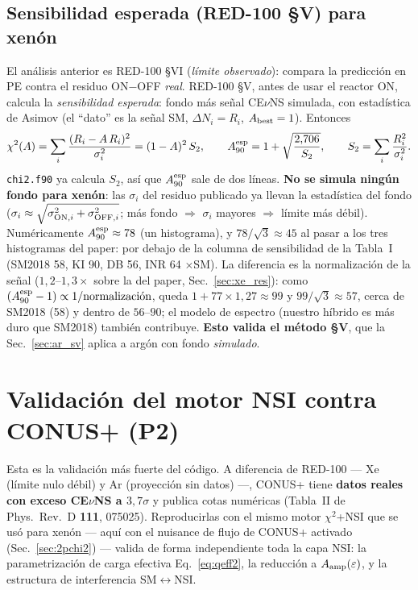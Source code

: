 \documentclass[11pt,a4paper]{article}
\newcommand{\eps}{\varepsilon}
\newcommand{\Aamp}{A_{\rm amp}}
\newcommand{\code}[1]{\texttt{#1}}
\begin{document}
\subsection{Sensibilidad esperada (RED-100 \S V) para xen\'on}
\label{sec:xe_sv}

El an\'alisis anterior es RED-100 \S VI (\emph{l\'imite observado}): compara la
predicci\'on en PE contra el residuo ON$-$OFF \emph{real}. RED-100 \S V, antes de
usar el reactor ON, calcula la \emph{sensibilidad esperada}: fondo m\'as se\~nal
CE$\nu$NS simulada, con estad\'istica de Asimov (el ``dato'' es la se\~nal SM,
$\Delta N_{i} = R_{i}$, $A_{\rm best}=1$). Entonces
\begin{equation}
  \label{eq:A90_esp}
  \chi^{2}(A) = \sum_{i}\frac{(R_{i} - A\,R_{i})^{2}}{\sigma_{i}^{2}}
             = (1-A)^{2}\,S_{2},
  \qquad
  A_{90}^{\rm esp} = 1 + \sqrt{\frac{2{,}706}{S_{2}}},
  \qquad
  S_{2} = \sum_{i}\frac{R_{i}^{2}}{\sigma_{i}^{2}} .
\end{equation}
\code{chi2.f90} ya calcula $S_{2}$, as\'i que $A_{90}^{\rm esp}$ sale de dos
l\'ineas. \textbf{No se simula ning\'un fondo para xen\'on}: las $\sigma_{i}$ del
residuo publicado ya llevan la estad\'istica del fondo
($\sigma_{i}\approx\sqrt{\sigma_{{\rm ON},i}^{2}+\sigma_{{\rm OFF},i}^{2}}$; m\'as
fondo $\Rightarrow$ $\sigma_{i}$ mayores $\Rightarrow$ l\'imite m\'as d\'ebil).
Num\'ericamente $A_{90}^{\rm esp}\approx 78$ (un histograma), y
$78/\sqrt{3}\approx 45$ al pasar a los tres histogramas del paper: por debajo de
la columna de sensibilidad de la Tabla~I (SM2018 58, KI 90, DB 56, INR 64
$\times$SM). La diferencia es la normalizaci\'on de la se\~nal ($1{,}2$--$1{,}3\times$
sobre la del paper, Sec.~\ref{sec:xe_res}): como $(A_{90}^{\rm esp}-1)\propto
1/\text{normalizaci\'on}$, queda $1+77\times1{,}27\approx 99$ y
$99/\sqrt{3}\approx 57$, cerca de SM2018 (58) y dentro de $56$--$90$; el modelo de
espectro (nuestro h\'ibrido es m\'as duro que SM2018) tambi\'en contribuye. \textbf{Esto valida el
m\'etodo \S V}, que la Sec.~\ref{sec:ar_sv} aplica a arg\'on con fondo
\emph{simulado}.

\section{Validaci\'on del motor NSI contra CONUS+ (P2)}
\label{sec:conusval}

Esta es la validaci\'on m\'as fuerte del c\'odigo. A diferencia de RED-100
--- Xe (l\'imite nulo d\'ebil) y Ar (proyecci\'on sin datos) ---, CONUS+ tiene
\textbf{datos reales con exceso CE$\nu$NS a $3{,}7\sigma$} y publica cotas
num\'ericas (Tabla~II de Phys.\ Rev.\ D \textbf{111}, 075025). Reproducirlas con
el mismo motor $\chi^{2}$+NSI que se us\'o para xen\'on --- aqu\'i con el nuisance
de flujo de CONUS+ activado (Sec.~\ref{sec:2pchi2}) --- valida de forma
independiente toda la capa NSI: la parametrizaci\'on de carga efectiva
Eq.~\eqref{eq:qeff2}, la reducci\'on a $\Aamp(\eps)$, y la estructura de
interferencia SM$\leftrightarrow$NSI.
\end{document}
